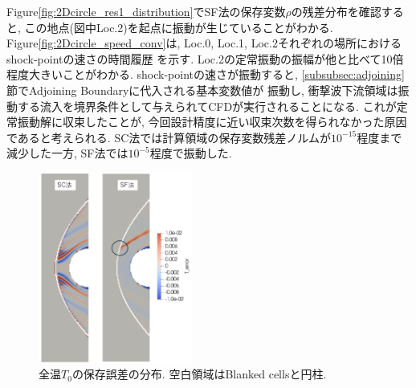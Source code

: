 \documentclass[a4j]{jarticle}
\begin{document}
Figure\ref{fig:2Dcircle_res1_distribution}でSF法の保存変数$\rho$の残差分布を確認すると, この地点(図中Loc.2)を起点に振動が生じていることがわかる.
Figure\ref{fig:2Dcircle_speed_conv}は, Loc.0, Loc.1, Loc.2それぞれの場所におけるshock-pointの速さの時間履歴
を示す. Loc.2の定常振動の振幅が他と比べて10倍程度大きいことがわかる. 
shock-pointの速さが振動すると, \ref{subsubsec:adjoining}節でAdjoining Boundaryに代入される基本変数値が
振動し, 衝撃波下流領域は振動する流入を境界条件として与えられてCFDが実行されることになる.
これが定常振動解に収束したことが, 今回設計精度に近い収束次数を得られなかった原因であると考えられる.
SC法では計算領域の保存変数残差ノルムが$10^{-15}$程度まで減少した一方, 
SF法では$10^{-5}$程度で振動した.

\begin{figure}[h]
    \begin{center}
        \includegraphics[width=0.45\textwidth]{t_error_distribution.pdf}
    \end{center}
    \caption{全温$T_0$の保存誤差の分布. 空白領域はBlanked cellsと円柱.}
    \label{fig:2Dcircle_t_error_distribution}
\end{figure}
\end{document}
